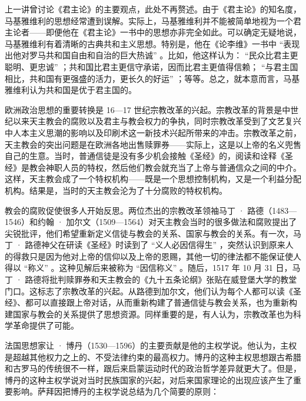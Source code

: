 上一讲曾讨论《君主论》的主要观点，此处不再赘述。由于《君主论》的知名度，马基雅维利的思想经常遭到误解。实际上，马基雅维利并不能被简单地视为一个君主论者——即便他在《君主论》一书中的思想亦非完全如此。可以确定无疑地说，马基雅维利有着清晰的古典共和主义思想。特别是，他在《论李维》一书中 “表现出他对罗马共和国自由和自治的巨大热诚” 。比如，他这样认为： “民众比君主更聪明、更忠诚” ；共和国比君主更信守承诺，因而比君主更值得信赖； “与君主国相比，共和国有更强盛的活力，更长久的好运” ；等等。总之，就本意而言，马基雅维利认为共和国是优于君主国的。

欧洲政治思想的重要转换是 16—17 世纪宗教改革的兴起。宗教改革的背景是中世纪以来天主教会的腐败以及君主与教会权力的争执，同时宗教改革受到了文艺复兴中人本主义思潮的影响以及印刷术这一新技术兴起所带来的冲击。宗教改革之前，天主教会的突出问题是在欧洲各地出售赎罪券——实际上，这是以上帝的名义兜售自己的生意。当时，普通信徒是没有多少机会接触《圣经》的，阅读和诠释《圣经》是教会神职人员的特权，然后他们教会就充当了上帝与普通信众之间的中介。这样，天主教会成了一个特权机构——既是一个思想控制机构，又是一个利益分配机构。结果是，当时的天主教会沦为了十分腐败的特权机构。

教会的腐败促使很多人开始反思。两位杰出的宗教改革领袖马丁 · 路德（1483—1546）和约翰 · 加尔文（1509—1564）对天主教会当时的很多做法和腐败提出了尖锐批评，他们希望重新定义信徒与教会的关系、国家与教会的关系。有一次，马丁 · 路德神父在研读《圣经》时读到了 “义人必因信得生” ，突然认识到原来人的得救只是因为他对上帝的信仰以及上帝的恩赐，其他一切的律法都不能保证使人得以 “称义” 。这种见解后来被称为 “因信称义” 。随后，1517 年 10 月 31 日，马丁 · 路德将批判赎罪券和天主教会的《九十五条论纲》张贴在威登堡大学的教堂门口。这标志了宗教改革的兴起。从路德到加尔文，他们认为每个人都可以读《圣经》、都可以直接跟上帝对话，从而重新构建了普通信徒与教会关系，也为重新构建国家与教会的关系提供了思想资源。同样重要的是，有人认为，宗教改革也为科学革命提供了可能。

法国思想家让 · 博丹（1530—1596）的主要贡献是他的主权学说。他认为，主权是超越其他权力之上的、不受法律约束的最高权力。博丹的这种主权思想跟古希腊和古罗马的传统很不一样，跟后来启蒙运动时代的政治哲学差异就更大了。但是，博丹的这种主权学说对当时民族国家的兴起，对后来国家理论的出现应该产生了重要影响。萨拜因把博丹的主权学说总结为几个简要的原则：

